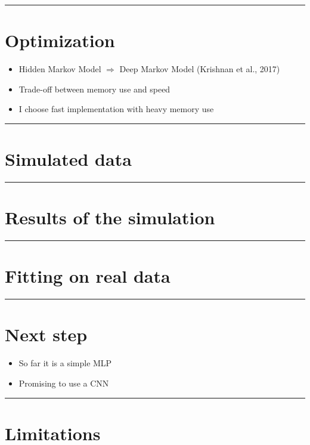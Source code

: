 \documentclass[
]{article}
\begin{document}
\begin{center}\rule{0.5\linewidth}{0.5pt}\end{center}

\section{Optimization}\label{optimization}

\begin{itemize}
\item
  Hidden Markov Model \(\Rightarrow\) Deep Markov Model (Krishnan et
  al., 2017)
\item
  Trade-off between memory use and speed
\item
  I choose fast implementation with heavy memory use
\end{itemize}

\begin{center}\rule{0.5\linewidth}{0.5pt}\end{center}

\section{Simulated data}\label{simulated-data}

\begin{center}\rule{0.5\linewidth}{0.5pt}\end{center}

\section{Results of the simulation}\label{results-of-the-simulation}

\begin{center}\rule{0.5\linewidth}{0.5pt}\end{center}

\section{Fitting on real data}\label{fitting-on-real-data}

\begin{center}\rule{0.5\linewidth}{0.5pt}\end{center}

\section{Next step}\label{next-step}

\begin{itemize}
\item
  So far it is a simple MLP
\item
  Promising to use a CNN
\end{itemize}

\begin{center}\rule{0.5\linewidth}{0.5pt}\end{center}

\section{Limitations}\label{limitations}
\end{document}

